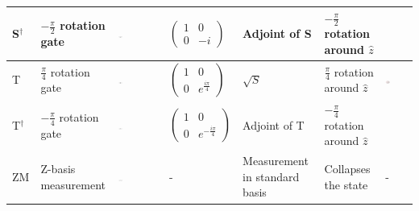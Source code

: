 \begin{table}[ht!]
\begin{tabular}{ C{0.3cm}  C{2cm}  C{1.5cm}  C{1.5cm} C{2.5cm} C{2cm} C{3.5cm}}
S$^\dagger$ & $-\frac{\pi}{2}$ rotation gate & \includegraphics[width=0.1\textwidth]{img/sdcircuit.png} &  $\begin{pmatrix}
 1 & 0 \\ 
 0 & -i
 \end{pmatrix}$ & Adjoint of S & $-\frac{\pi}{2}$ rotation around $\hat{z}$ & \\\midrule
T & $\frac{\pi}{4}$ rotation gate & \includegraphics[width=0.1\textwidth]{img/tcircuit.png} & $\begin{pmatrix}
 1 & 0 \\ 
 0 & e^{\frac{i\pi}{4}}
 \end{pmatrix}$ & $\sqrt{S}$ & $\frac{\pi}{4}$ rotation around $\hat{z}$ & \includegraphics[width=0.2\textwidth]{img/blochtgate.png}\\\midrule
T$^\dagger$ & $-\frac{\pi}{4}$ rotation gate & \includegraphics[width=0.1\textwidth]{img/tdcircuit.png} & $\begin{pmatrix}
 1 & 0 \\ 
 0 & e^{-\frac{i\pi}{4}}
 \end{pmatrix}$ & Adjoint of T & $-\frac{\pi}{4}$ rotation around $\hat{z}$ & \\\midrule
ZM & Z-basis measurement & \includegraphics[width=0.1\textwidth]{img/measurecircuit.png} & - & Measurement in standard basis & Collapses the state & - \\
\end{tabular}
\end{table}


